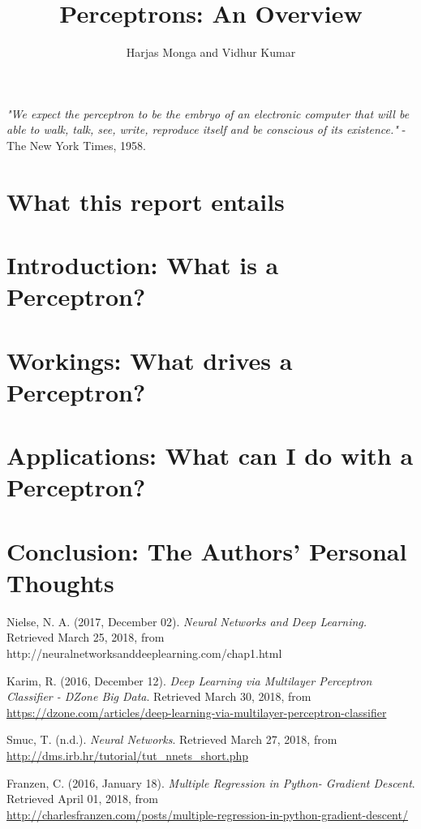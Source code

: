\documentclass[12pt, titlepage, a4paper]{article}
\title{Perceptrons: An Overview}
\author{Harjas Monga and Vidhur Kumar}
\begin{document}
	\maketitle
	
	\tableofcontents
	
	\newpage

	\textit{"We expect the perceptron to be the embryo of an electronic computer that will be able to walk, talk, see, write, reproduce itself and be conscious of its existence."} - The New York Times, 1958.	
	
	\section{What this report entails}
			
	\section{Introduction: What is a Perceptron?}
		
	\section{Workings: What drives a Perceptron?}
		
	\section{Applications: What can I do with a Perceptron?}
		
	\section{Conclusion: The Authors' Personal Thoughts}
		
		
		\newpage
		
	\begin{thebibliography}{1}

	 Nielse, N. A. (2017, December 02). {\em Neural Networks and Deep Learning.} Retrieved March 25, 2018, from\\ {http://neuralnetworksanddeeplearning.com/chap1.html}

  	 Karim, R. (2016, December 12). {\em Deep Learning via Multilayer Perceptron Classifier - DZone Big Data}. Retrieved March 30, 2018, from \\ \url{https://dzone.com/articles/deep-learning-via-multilayer-perceptron-classifier}

  	 Smuc, T. (n.d.). {\em Neural Networks}. Retrieved March 27, 2018, from\\ \url{http://dms.irb.hr/tutorial/tut_nnets_short.php}
  	
  	 Franzen, C. (2016, January 18). {\em Multiple Regression in Python- Gradient Descent}. Retrieved April 01, 2018, from\\ \url{http://charlesfranzen.com/posts/multiple-regression-in-python-gradient-descent/}


  \end{thebibliography}
\end{document}

